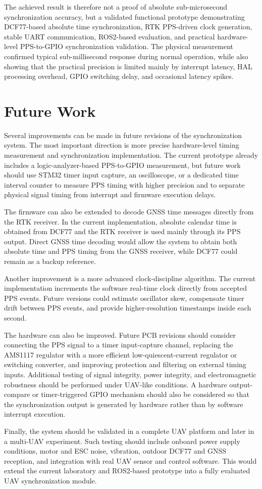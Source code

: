 The achieved result is therefore not a proof of absolute sub-microsecond synchronization accuracy, but a validated functional prototype demonstrating DCF77-based absolute time synchronization, RTK PPS-driven clock generation, stable UART communication, ROS2-based evaluation, and practical hardware-level PPS-to-GPIO synchronization validation. The physical measurement confirmed typical sub-millisecond response during normal operation, while also showing that the practical precision is limited mainly by interrupt latency, HAL processing overhead, GPIO switching delay, and occasional latency spikes.

\section{Future Work}

Several improvements can be made in future revisions of the synchronization system. The most important direction is more precise hardware-level timing measurement and synchronization implementation. The current prototype already includes a logic-analyzer-based PPS-to-GPIO measurement, but future work should use STM32 timer input capture, an oscilloscope, or a dedicated time interval counter to measure PPS timing with higher precision and to separate physical signal timing from interrupt and firmware execution delays.

The firmware can also be extended to decode GNSS time messages directly from the RTK receiver. In the current implementation, absolute calendar time is obtained from DCF77 and the RTK receiver is used mainly through its PPS output. Direct GNSS time decoding would allow the system to obtain both absolute time and PPS timing from the GNSS receiver, while DCF77 could remain as a backup reference.

Another improvement is a more advanced clock-discipline algorithm. The current implementation increments the software real-time clock directly from accepted PPS events. Future versions could estimate oscillator skew, compensate timer drift between PPS events, and provide higher-resolution timestamps inside each second.

The hardware can also be improved. Future PCB revisions should consider connecting the PPS signal to a timer input-capture channel, replacing the AMS1117 regulator with a more efficient low-quiescent-current regulator or switching converter, and improving protection and filtering on external timing inputs. Additional testing of signal integrity, power integrity, and electromagnetic robustness should be performed under UAV-like conditions. A hardware output-compare or timer-triggered GPIO mechanism should also be considered so that the synchronization output is generated by hardware rather than by software interrupt execution.

Finally, the system should be validated in a complete UAV platform and later in a multi-UAV experiment. Such testing should include onboard power supply conditions, motor and ESC noise, vibration, outdoor DCF77 and GNSS reception, and integration with real UAV sensor and control software. This would extend the current laboratory and ROS2-based prototype into a fully evaluated UAV synchronization module.

